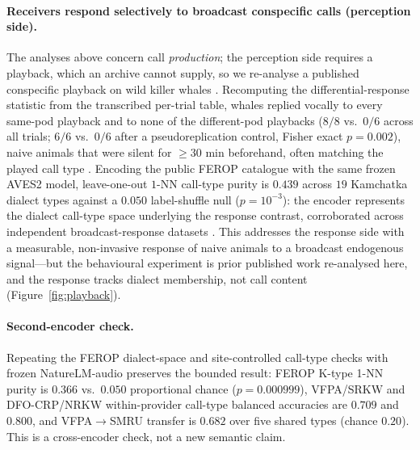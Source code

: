 \documentclass[11pt]{article}
\begin{document}
\paragraph{Receivers respond selectively to broadcast conspecific calls (perception side).}
The analyses above concern call \emph{production}; the perception side requires a playback,
which an archive cannot supply, so we re-analyse a published conspecific playback on wild
killer whales \citep{filatova2011playback}. Recomputing the differential-response statistic
from the transcribed per-trial table, whales replied vocally to every same-pod playback and to
none of the different-pod playbacks ($8/8$ vs.\ $0/6$ across all trials; $6/6$ vs.\ $0/6$ after
a pseudoreplication control, Fisher exact $p=0.002$), naive animals that were silent for
$\geq30$ min beforehand, often matching the played call type \citep{miller2004repertoires}.
Encoding the public FEROP catalogue \citep{russianorca_catalogue} with the same frozen AVES2
model, leave-one-out $1$-NN call-type purity is $0.439$ across $19$ Kamchatka dialect types
against a $0.050$ label-shuffle null ($p=10^{-3}$): the encoder represents the dialect
call-type space underlying the response contrast, corroborated across independent broadcast-response datasets
\citep{selbmann2026aversive,bowers2018}. This addresses the response side with a measurable,
non-invasive response of naive animals to a broadcast endogenous signal---but the behavioural
experiment is prior published work re-analysed here, and the response tracks dialect
membership, not call content (Figure~\ref{fig:playback}).

\paragraph{Second-encoder check.} Repeating the FEROP dialect-space and site-controlled
call-type checks with frozen NatureLM-audio \citep{robinson2024naturelm} preserves the bounded
result: FEROP K-type 1-NN purity is $0.366$ vs.\ $0.050$ proportional chance
($p=0.000999$), VFPA/SRKW and DFO-CRP/NRKW within-provider call-type balanced accuracies are
$0.709$ and $0.800$, and VFPA$\to$SMRU transfer is $0.682$ over five shared types (chance
$0.20$). This is a cross-encoder check, not a new semantic claim.
\end{document}
